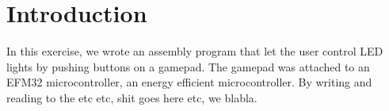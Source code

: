 \section{Introduction}

In this exercise, we wrote an assembly program that let the user control LED lights by pushing buttons on a gamepad. The gamepad was attached to an EFM32 microcontroller, an energy efficient microcontroller. By writing and reading to the etc etc, shit goes here etc, we blabla.
